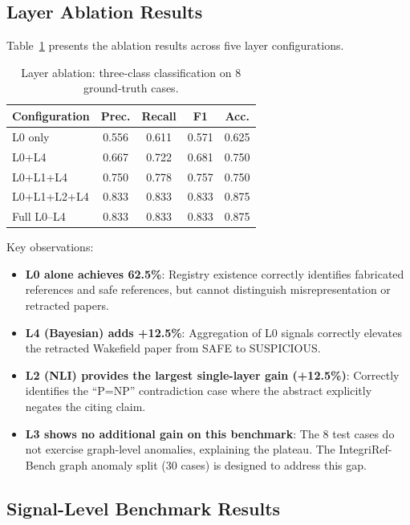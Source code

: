 \documentclass[sigconf,nonacm]{acmart}
\begin{document}
\subsection{Layer Ablation Results}

Table~\ref{tab:ablation} presents the ablation results across five layer configurations.

\begin{table}[t]
\caption{Layer ablation: three-class classification on 8 ground-truth cases.}
\label{tab:ablation}
\centering
\small
\begin{tabular}{lcccc}
\toprule
\textbf{Configuration} & \textbf{Prec.} & \textbf{Recall} & \textbf{F1} & \textbf{Acc.} \\
\midrule
L0 only          & 0.556 & 0.611 & 0.571 & 0.625 \\
L0+L4            & 0.667 & 0.722 & 0.681 & 0.750 \\
L0+L1+L4         & 0.750 & 0.778 & 0.757 & 0.750 \\
L0+L1+L2+L4      & 0.833 & 0.833 & 0.833 & 0.875 \\
Full L0--L4       & 0.833 & 0.833 & 0.833 & 0.875 \\
\bottomrule
\end{tabular}
\end{table}

Key observations:

\begin{itemize}[leftmargin=*]
    \item \textbf{L0 alone achieves 62.5\%}: Registry existence correctly identifies fabricated references and safe references, but cannot distinguish misrepresentation or retracted papers.
    \item \textbf{L4 (Bayesian) adds +12.5\%}: Aggregation of L0 signals correctly elevates the retracted Wakefield paper from SAFE to SUSPICIOUS.
    \item \textbf{L2 (NLI) provides the largest single-layer gain (+12.5\%)}: Correctly identifies the ``P=NP'' contradiction case where the abstract explicitly negates the citing claim.
    \item \textbf{L3 shows no additional gain on this benchmark}: The 8 test cases do not exercise graph-level anomalies, explaining the plateau. The IntegriRef-Bench graph anomaly split (30 cases) is designed to address this gap.
\end{itemize}

\subsection{Signal-Level Benchmark Results}
\end{document}

